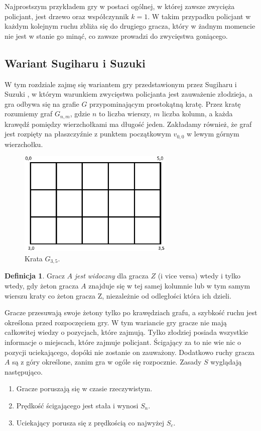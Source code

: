 \documentclass[brudnopis]{xmgr}
\theoremstyle{definition}
\newtheorem{Definicja}{Definicja}
\begin{document}
Najprostszym przykładem gry w postaci ogólnej, w której zawsze zwycięża policjant, jest drzewo oraz współczynnik $k = 1$. W takim przypadku policjant w każdym kolejnym ruchu zbliża się do drugiego gracza, który w żadnym momencie nie jest w stanie go minąć, co zawsze prowadzi do zwycięstwa goniącego.

\subsection{Wariant Sugiharu i Suzuki} \label{sugiharu}
W tym rozdziale zajmę się wariantem gry przedstawionym przez Sugiharu i Suzuki \cite{sugiharu}, w którym warunkiem zwycięstwa policjanta jest zauważenie złodzieja, a gra odbywa się na grafie $G$ przypominającym prostokątną kratę.
Przez kratę rozumiemy graf $G_{n,m}$, gdzie $n$ to liczba wierszy, $m$ liczba kolumn, a każda krawędź pomiędzy wierzchołkami ma długość jeden. Zakładamy również, że graf jest rozpięty na płaszczyźnie z punktem początkowym $v_{0,0}$ w lewym górnym wierzchołku.
\begin{figure}[ht!]
   \centering
    \includegraphics[height=5cm]{rysunki/siatka_3_5.png}
    \caption{Krata $G_{3,5}$.}
\end{figure}

\begin{Definicja}
  Gracz $A$ \emph{jest widoczny} dla gracza $Z$ (i vice versa) wtedy i tylko wtedy, gdy żeton gracza $A$ znajduje się w tej samej kolumnie lub w tym samym wierszu kraty co żeton gracza Z, niezależnie od odległości która ich dzieli.
\end{Definicja}

Gracze przesuwają swoje żetony tylko po krawędziach grafu, a szybkość ruchu jest określona przed rozpoczęciem gry.
W tym wariancie gry gracze nie mają całkowitej wiedzy o pozycjach, które zajmują. Tylko złodziej posiada wszystkie informacje o miejscach, które zajmuje policjant. Ścigający za to nie wie nic o pozycji uciekającego, dopóki nie zostanie on zauważony. Dodatkowo ruchy gracza $A$ są z góry określone, zanim gra w ogóle się rozpocznie.
Zasady $S$ wyglądają następująco.
\begin{enumerate}
  \item Gracze poruszają się w czasie rzeczywistym.
  \item Prędkość ścigającego jest stała i wynosi $S_n$.
  \item Uciekający porusza się z prędkością co najwyżej $S_c$.
\end{enumerate}
\end{document}
